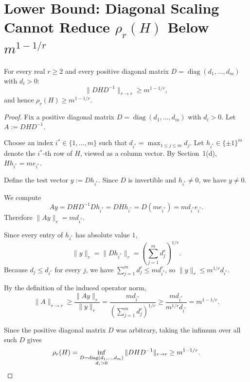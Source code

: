 \section{Lower Bound: Diagonal Scaling Cannot Reduce $\rho_r(H)$ Below $m^{1-1/r}$}

\begin{proposition}
For every real $r \geq 2$ and every positive diagonal matrix $D = \operatorname{diag}(d_1, \ldots, d_m)$ with $d_i > 0$:
\[
\|D H D^{-1}\|_{r \to r} \geq m^{1-1/r},
\]
and hence $\rho_r(H) \geq m^{1-1/r}$.
\end{proposition}

\begin{proof}
Fix a positive diagonal matrix $D=\operatorname{diag}(d_1,\ldots,d_m)$ with $d_i>0$. Let $A:=DHD^{-1}$.

Choose an index $i^*\in\{1,\ldots,m\}$ such that $d_{i^*}=\max_{1\le j\le m} d_j$. Let $h_{i^*}\in\{\pm 1\}^m$ denote the $i^*$-th row of $H$, viewed as a column vector. By Section~1(d), $Hh_{i^*}=me_{i^*}$.

Define the test vector $y:=Dh_{i^*}$. Since $D$ is invertible and $h_{i^*}\neq 0$, we have $y\neq 0$.

We compute
\[
Ay = DHD^{-1}Dh_{i^*} = DHh_{i^*} = D(me_{i^*}) = md_{i^*}e_{i^*}.
\]
Therefore $\|Ay\|_r = md_{i^*}$.

Since every entry of $h_{i^*}$ has absolute value $1$,
\[
\|y\|_r = \|Dh_{i^*}\|_r = \left(\sum_{j=1}^m d_j^r\right)^{1/r}.
\]
Because $d_j\le d_{i^*}$ for every $j$, we have $\sum_{j=1}^m d_j^r \le m d_{i^*}^r$, so $\|y\|_r \le m^{1/r}d_{i^*}$.

By the definition of the induced operator norm,
\[
\|A\|_{r\to r} \ge \frac{\|Ay\|_r}{\|y\|_r} = \frac{md_{i^*}}{\left(\sum_{j=1}^m d_j^r\right)^{1/r}} \ge \frac{md_{i^*}}{m^{1/r}d_{i^*}} = m^{1-1/r}.
\]

Since the positive diagonal matrix $D$ was arbitrary, taking the infimum over all such $D$ gives
\[
\rho_r(H) = \inf_{\substack{D=\operatorname{diag}(d_1,\ldots,d_m)\\ d_i>0}} \|DHD^{-1}\|_{r\to r} \ge m^{1-1/r}. \qedhere
\]
\end{proof}
